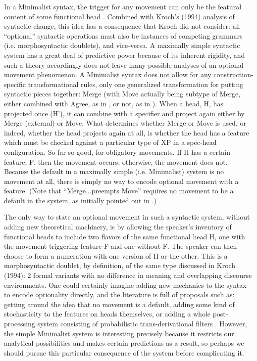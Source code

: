 In a Minimalist syntax, the trigger for any movement can only be the featural content of some functional head \citep{chomsky2000, chomsky2001}.
Combined with Kroch's (1994) analysis of syntactic change, this idea has a consequence that Kroch did not consider: all ``optional'' syntactic operations must also be instances of competing grammars (i.e. morphosyntactic doublets), and vice-versa.
A maximally simple syntactic system has a great deal of predictive power because of its inherent rigidity, and such a theory accordingly does not leave many possible analyses of an optional movement phenomenon.
A Minimalist syntax does not allow for any construction-specific transformational rules, only one generalized transformation for putting syntactic pieces together: Merge (with Move actually being subtype of Merge, either combined with Agree, as in \citealt{chomsky2000}, or not, as in \citealt{chomsky2004, chomsky2008}).
When a head, H, has projected once (H'), it can combine with a specifier and project again either by Merge (external) or Move.
What determines whether Merge or Move is used, or indeed, whether the head projects again at all, is whether the head has a feature which must be checked against a particular type of XP in a spec-head configuration.
So far so good, for obligatory movements.
If H has a certain feature, F, then the movement occurs; otherwise, the movement does not.
Because the default in a maximally simple (i.e. Minimalist) system is no movement at all, there is simply no way to encode optional movement with a feature.
(Note that ``Merge...preempts Move'' requires no movement to be a default in the system, as initially pointed out in \citealt{chomsky2000}.)

The only way to state an optional movement in such a syntactic system, without adding new theoretical machinery, is by allowing the speaker's inventory of functional heads to include two flavors of the same functional head H, one with the movement-triggering feature F and one without F.
The speaker can then choose to form a numeration with one version of H or the other.
This is a morphosyntactic doublet, by definition, of the same type discussed in Kroch (1994): 2 formal variants with no difference in meaning and overlapping discourse environments.
One could certainly imagine adding new mechanics to the syntax to encode optionality directly, and the literature is full of proposals such as: getting around the idea that no movement is a default, adding some kind of stochasticity to the features on heads themselves, or adding a whole post-processing system consisting of probabilistic trans-derivational filters .
However, the simple Minimalist system is interesting precisely because it restricts our analytical possibilities and makes certain predictions as a result, so perhaps we should pursue this particular consequence of the system before complicating it.

